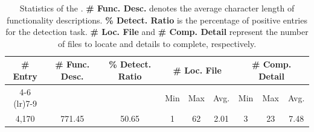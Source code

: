 \begin{table}[t]
\centering
\small
\caption{Statistics of the \benchmark. \textbf{\# Func. Desc.} denotes the average character length of functionality descriptions. \textbf{\% Detect. Ratio} is the percentage of positive entries for the detection task. \textbf{\# Loc. File} and \textbf{\# Comp. Detail} represent the number of files to locate and details to complete, respectively.}
\vspace{-1em}
\label{tab:benchmark_stats}
\renewcommand{\arraystretch}{0.6}
\setlength{\tabcolsep}{1.2pt}
\begin{tabular}{cc c ccc ccc}
\toprule
\multirow{2}{*}{\textbf{\# Entry}} & \multirow{2}{*}{\textbf{\# Func. Desc.}} & \multirow{2}{*}{\textbf{\% Detect. Ratio}} & \multicolumn{3}{c}{\textbf{\# Loc. File}} & \multicolumn{3}{c}{\textbf{\# Comp. Detail}}\\
\cmidrule(lr){4-6} \cmidrule(lr){7-9}
& & & Min & Max & Avg. & Min & Max & Avg. \\
\midrule
4,170 & 771.45 & 50.65 & 1 & 62 & 2.01 & 3 & 23 & 7.48 \\
\bottomrule
\end{tabular}
\vspace{-1.0em}
\end{table}